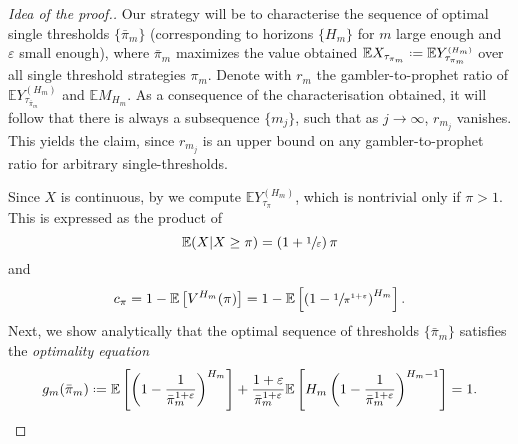 \documentclass[11pt, a4paper, twoside]{article}
\newcommand*{\defeq}{\mathrel{\vcenter{\baselineskip0.5ex \lineskiplimit0pt
			\hbox{\scriptsize.}\hbox{\scriptsize.}}}=}
\newcommand{\ssup}[1]{{\scriptscriptstyle{({#1})}}}
\newcommand{\eps}{\varepsilon}
\newcommand{\EE}{\mathbb{E}}
\numberwithin{equation}{section}
\begin{document}
    \begin{proof}[Idea of the proof.]
        Our strategy will be to characterise the sequence of optimal single thresholds $\{\bar{\pi}_m\}$ (corresponding to horizons $\{H_m\}$ for $m$ large enough and $\eps$ small enough), where $\bar{\pi}_m$ maximizes the value obtained $\EE X_{\tau_{\pi_m}} \defeq \EE Y_{\tau_{\pi_m}}^\ssup{H_m}$ over all single threshold strategies $\pi_m$.
        Denote with $r_m$ the gambler-to-prophet ratio of $\EE Y_{\tau_{\bar{\pi}_{m}}}^\ssup{H_{m}}$ and $\EE M_{H_{m}}$. As a consequence of the characterisation obtained, it will follow that there is always a subsequence $\{m_j\}$, such that as $j\longrightarrow\infty$, $r_{m_j}$ vanishes. This yields the claim, since $r_{m_j}$ is an upper bound on any gambler-to-prophet ratio for arbitrary single-thresholds. 
    
		Since $X$ is continuous, by  we compute $\EE Y_{\tau_\pi}^\ssup{H_m}$, which is nontrivial only if $\pi>1$. This is expressed as the product of \[\EE(X|X\ge\pi)=\left(1+\sfrac{1}{\eps}\right)\pi\]
		and \[c_\pi=1-\EE\left[ V^{H_m}(\pi)\right]=1-\EE\left[\left(1-\sfrac{1}{\pi^{1+\eps}}\right)^{H_m}\right].\] Next, we show analytically that the optimal sequence of thresholds $\{\bar{\pi}_m\}$ satisfies the \textit{optimality equation} 
		\begin{equation*}
			g_m(\bar{\pi}_m)\defeq\EE\left[\left(1-\frac{1}{\bar{\pi}_m^{1+\eps}}\right)^{H_m}\right]+\frac{1+\eps}{\bar{\pi}_m^{1+\eps}}\EE\left[ H_m\left(1-\frac{1}{\bar{\pi}_m^{1+\eps}}\right)^{H_m-1}\right]=1.
		\end{equation*}
		

\end{proof}
\end{document}
